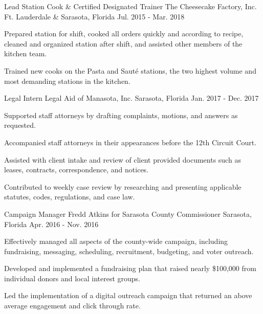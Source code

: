 \begin{cventries}
  \cventry
    {Lead Station Cook \& Certified Designated Trainer} %
    {The Cheesecake Factory, Inc.} %
    {Ft. Lauderdale \& Sarasota, Florida} %
    {Jul. 2015 - Mar. 2018} %
    {
      \begin{cvitems} %
        \item {Prepared station for shift, cooked all orders quickly and according to recipe, cleaned and organized station after shift, and assisted other members of the kitchen team.}
        \item {Trained new cooks on the Pasta and Sauté stations, the two highest volume and most demanding stations in the kitchen.}
      \end{cvitems}
    }

  \cventry
    {Legal Intern} %
    {Legal Aid of Manasota, Inc.} %
    {Sarasota, Florida} %
    {Jan. 2017 - Dec. 2017} %
    {
      \begin{cvitems} %
        \item {Supported staff attorneys by drafting complaints, motions, and answers as requested.}
        \item {Accompanied staff attorneys in their appearances before the 12th Circuit Court.}
        \item {Assisted with client intake and review of client provided documents such as leases, contracts, correspondence, and notices.}
        \item {Contributed to weekly case review by researching and presenting applicable statutes, codes, regulations, and case law.}
      \end{cvitems}
    }

  \cventry
    {Campaign Manager} %
    {Fredd Atkins for Sarasota County Commissioner} %
    {Sarasota, Florida} %
    {Apr. 2016 - Nov. 2016} %
    {
      \begin{cvitems} %
        \item {Effectively managed all aspects of the county-wide campaign, including fundraising, messaging, scheduling, recruitment, budgeting, and voter outreach.}
        \item {Developed and implemented a fundraising plan that raised nearly \$100,000 from individual donors and local interest groups.}
        \item {Led the implementation of a digital outreach campaign that returned an above average engagement and click through rate.}
      \end{cvitems}
    }


\end{cventries}
